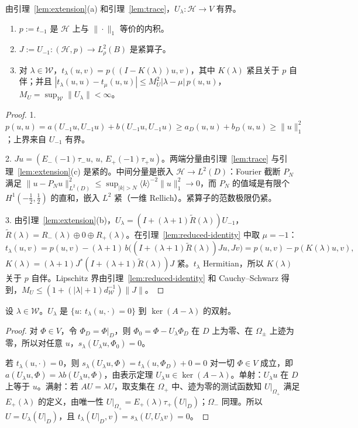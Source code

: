 \documentclass[11pt,a4paper,fontset=fandol]{ctexart}
\begin{document}
由引理~\ref{lem:extension}(a) 和引理~\ref{lem:trace}，$U_\lambda:\mathcal H\to V$ 有界。

\begin{lemma}[约化形式的结构]
\label{lem:structure}
\begin{enumerate}
\item $p:=t_{-1}$ 是 $\mathcal H$ 上与 $\|\cdot\|_1$ 等价的内积。
\item $J:=U_{-1}:(\mathcal H,p)\to L^2_\rho(B)$ 是紧算子。
\item 对 $\lambda\in\mathcal W$，$t_\lambda(u,v)=p((I-K(\lambda))u,v)$，其中 $K(\lambda)$ 紧且关于 $p$ 自伴；并且 $|t_\lambda(u,u)-t_\mu(u,u)|\le M_U^2|\lambda-\mu|\,p(u,u)$，$M_U=\sup_{\mathcal W}\|U_\lambda\|<\infty$。
\end{enumerate}
\end{lemma}

\begin{proof}
1. $p(u,u)=a(U_{-1}u,U_{-1}u)+b(U_{-1}u,U_{-1}u)\ge a_D(u,u)+b_D(u,u)\ge\|u\|_1^2$；上界来自 $U_{-1}$ 有界。

2. $Ju=(E_-(-1)\tau_-u,\,u,\,E_+(-1)\tau_+u)$。两端分量由引理~\ref{lem:trace} 与引理~\ref{lem:extension}(c) 是紧的。中间分量是嵌入 $\mathcal H\to L^2(D)$：Fourier 截断 $P_N$ 满足 $\|u-P_Nu\|_{L^2(D)}^2\le\sup_{|k|>N}\langle k\rangle^{-2}\|u\|_1^2\to0$，而 $P_N$ 的值域是有限个 $H^1(-\frac12,\frac12)$ 的直和，嵌入 $L^2$ 紧（一维 Rellich）。紧算子的范数极限仍紧。

3. 由引理~\ref{lem:extension}(b)，$U_\lambda=(I+(\lambda+1)\tilde R(\lambda))U_{-1}$，$\tilde R(\lambda)=R_-(\lambda)\oplus0\oplus R_+(\lambda)$。在引理~\ref{lem:reduced-identity} 中取 $\mu=-1$：
\[
t_\lambda(u,v)=p(u,v)-(\lambda+1)\,b\bigl((I+(\lambda+1)\tilde R(\lambda))Ju,Jv\bigr)=p(u,v)-p(K(\lambda)u,v),
\]
$K(\lambda)=(\lambda+1)J^*(I+(\lambda+1)\tilde R(\lambda))J$ 紧。$t_\lambda$ Hermitian，所以 $K(\lambda)$ 关于 $p$ 自伴。Lipschitz 界由引理~\ref{lem:reduced-identity} 和 Cauchy--Schwarz 得到，$M_U\le(1+(|\lambda|+1)d_{\mathcal W}^{-1})\|J\|$。
\end{proof}

\begin{lemma}[核的对应]
\label{lem:kernel}
设 $\lambda\in\mathcal W$。$U_\lambda$ 是 $\{u:\ t_\lambda(u,\cdot)=0\}$ 到 $\ker(A-\lambda)$ 的双射。
\end{lemma}

\begin{proof}
对 $\Phi\in V$，令 $\Phi_D=\Phi|_D$，则 $\Phi_0=\Phi-U_\lambda\Phi_D$ 在 $D$ 上为零、在 $\Omega_\pm$ 上迹为零，所以对任意 $u$，$s_\lambda(U_\lambda u,\Phi_0)=0$。

若 $t_\lambda(u,\cdot)=0$，则 $s_\lambda(U_\lambda u,\Phi)=t_\lambda(u,\Phi_D)+0=0$ 对一切 $\Phi\in V$ 成立，即 $a(U_\lambda u,\Phi)=\lambda b(U_\lambda u,\Phi)$，由表示定理 $U_\lambda u\in\ker(A-\lambda)$。单射：$U_\lambda u$ 在 $D$ 上等于 $u$。满射：若 $AU=\lambda U$，取支集在 $\Omega_+$ 中、迹为零的测试函数知 $U|_{\Omega_+}$ 满足 $E_+(\lambda)$ 的定义，由唯一性 $U|_{\Omega_+}=E_+(\lambda)\tau_+(U|_D)$；$\Omega_-$ 同理。所以 $U=U_\lambda(U|_D)$，且 $t_\lambda(U|_D,v)=s_\lambda(U,U_\lambda v)=0$。
\end{proof}
\end{document}
